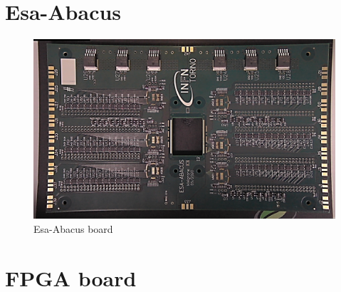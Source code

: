 \section{Esa-Abacus}\label{esaabacus}
\begin{figure}[H]
	\centering
	\includegraphics[width=0.7\linewidth]{IMG/ch2/EsaAbacus.png}
	\caption{Esa-Abacus board}
	\label{fig:esaabacus}
\end{figure}

\section{FPGA board}

